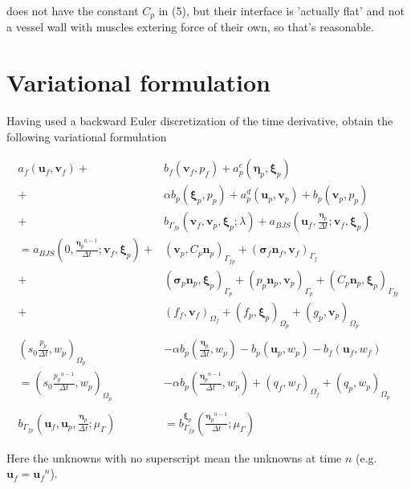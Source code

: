 \documentclass{article}
\newcommand{\mathspace}[1]{\ensuremath{#1}\xspace} %
\newcommand{\sigmabf}{\mathspace{\boldsymbol{\sigma}}}
\newcommand{\inner}[2]{\mathspace{\left (#1, #2 \right)}}
\newcommand{\dt}{\mathspace{\Delta t}}
\newcommand{\stokes}{\mathspace{\Omega_{f}}}
\newcommand{\stokesbdy}{\mathspace{\Gamma_{f}}}
\newcommand{\darcy}{\mathspace{\Omega_{p}}}
\newcommand{\darcybdy}{\mathspace{\Gamma_{p}}}
\newcommand{\interface}{\mathspace{\Gamma_{fp}}}
\newcommand{\nf}{\mathspace{\mathbf{n}_f}}
\newcommand{\np}{\mathspace{\mathbf{n}_p}}
\newcommand{\uf}{\mathspace{\mathbf{u}_f}}
\newcommand{\vf}{\mathspace{\mathbf{v}_f}}
\newcommand{\up}{\mathspace{\mathbf{u}_p}}
\newcommand{\vp}{\mathspace{\mathbf{v}_p}}
\newcommand{\pf}{\mathspace{p_f}}
\newcommand{\pp}{\mathspace{p_p}}
\newcommand{\wf}{\mathspace{w_f}}
\renewcommand{\wp}{\mathspace{w_p}}
\newcommand{\disp}{\mathspace{\boldsymbol{\eta}_p}}
\newcommand{\disptest}{\mathspace{\boldsymbol{\xi}_p}}
\newcommand{\multtest}{\mathspace{\mu_{\Gamma}}}
\begin{document}
\cite{ambartsumyan} does not have the constant $C_p$ in (5), but their interface is 'actually flat' and not a vessel wall with muscles extering force of their own, so that's reasonable.


\section{Variational formulation}
Having used a backward Euler discretization of the time derivative, \cite{ambartsumyan} obtain the following variational formulation

\begin{subequations}
  \begin{align}
    a_f(\uf, \vf) +& b_f(\vf, \pf)  + a^e_p(\disp, \disptest) \label{eq:varform1} \\
    +&\alpha b_p(\disptest, \pp)  + a_p^d(\up, \vp) + b_p(\vp, \pp)  \nonumber \\
    + &b_{\interface}\left (\vf, \vp, \disptest; \lambda \right ) + a_{BJS}\left (\uf, \frac{\disp} {\dt}; \vf, \disptest \right)\nonumber \\
                   = a_{BJS}\left (0, \frac{\disp^{n-1}} {\dt}; \vf, \disptest \right) + & \inner{\vp}{C_p\np}_{\interface} + (\sigmabf_f\nf, \vf)_{\stokesbdy}  \nonumber \\
    + & (\sigmabf_p\np, \disptest)_{\darcybdy} + (\pp\np, \vp)_{\darcybdy} + \inner{C_p\np}{\disptest}_{\interface}\nonumber \\
    + & \inner{f_f}{\vf}_{\stokes} + \inner{f_p}{\disptest}_{\darcy}  + \inner{g_p}{\vp}_{\darcy}\nonumber \\ \nonumber \\ %
    \inner{s_0 \frac {\pp} {\dt}}{\wp}_{\darcy}  &- \alpha b_p\left ( \frac{\disp} {\dt}, \wp \right ) - b_p(\up, \wp) - b_f(\uf, \wf) \label{eq:varform2}
    \\ = \inner{s_0 \frac {\pp^{n-1}} {\dt}}{\wp}_{\darcy} &- \alpha b_p\left ( \frac {\disp^{n-1}} {\dt}, \wp \right )  + \inner{q_f}{\wf}_{\stokes} + \inner{q_p}{\wp}_{\darcy}  \nonumber \\ \nonumber \\
    b_{\interface}\left (\uf, \up, \frac {\disp} {\dt}; \multtest \right ) &= b^{\disptest}_{\interface}\left (\frac {\disp^{n-1}} {\dt}; \multtest \right ) \label{eq:varform3}
  \end{align}
\end{subequations}

Here the unknowns with no superscript mean the unknowns at time $n$ (e.g. $\uf = \uf^n$). 
\end{document}
